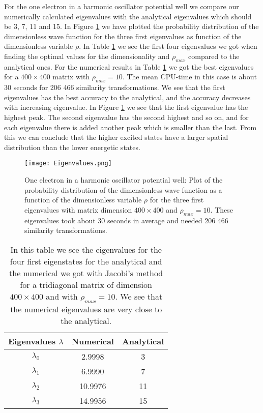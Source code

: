 \documentclass[12pt,a4paper,english]{article}
\begin{document}
For the one electron in a harmonic oscillator potential well we compare our numerically calculated eigenvalues with the analytical eigenvalues which should be 3, 7, 11 and 15. In Figure \ref{fig:eigenvalues} we have plotted the probability distribution of the dimensionless wave function for the three first eigenvalues as function of the dimensionless variable $\rho$. In Table \ref{tab:ex_d} we see the first four eigenvalues we got when finding the optimal values for the dimensionality and $\rho_{max}$ compared to the analytical ones. For the numerical results in Table \ref{tab:ex_d} we got the best eigenvalues for a $400\times400$ matrix with $\rho_{max}=10$. The mean CPU-time in this case is about 30 seconds for 206 466 similarity transformations. We see that the first eigenvalues has the best accuracy to the analytical, and the accuracy decreases with increasing eigenvalue. In Figure \ref{fig:eigenvalues} we see that the first eigenvalue has the highest peak. The second eigenvalue has the second highest and so on, and for each eigenvalue there is added another peak which is smaller than the last. From this we can conclude that the higher excited states have a larger spatial distribution than the lower energetic states.

\begin{figure}[htbp]
	\centering\texttt{[image: Eigenvalues.png]}
	\caption{One electron in a harmonic oscillator potential well: Plot of the probability distribution of the dimensionless wave function as a function of the dimensionless variable $\rho$ for the three first eigenvalues with matrix dimension $400\times400$ and $\rho_{max}=10$. These eigenvalues took about 30 seconds in average and needed 206 466 similarity transformations. \label{fig:eigenvalues}}
\end{figure}

\begin{table}[h!]
	\centering
	\begin{tabular}{ |c|c|c| }
		\hline \rule{0pt}{13pt}
		Eigenvalues $\lambda$ & Numerical & Analytical \\
		\hline \rule{0pt}{13pt}
		$\lambda_0$ & 2.9998 & 3 \\
		\hline \rule{0pt}{13pt}
		$\lambda_1$ & 6.9990 & 7 \\
		\hline \rule{0pt}{13pt}
		$\lambda_2$ & 10.9976 & 11 \\
		\hline \rule{0pt}{13pt}
		$\lambda_3$ & 14.9956 & 15 \\
		\hline 
	\end{tabular}	
	\caption{In this table we see the eigenvalues for the four first eigenstates for the analytical and the numerical we got with Jacobi's method for a tridiagonal matrix of dimension $400\times400$ and with $\rho_{max}=10$. We see that the numerical eigenvalues are very close to the analytical.}
	\label{tab:ex_d}
\end{table}
\end{document}
